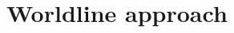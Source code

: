 \documentclass[a4paper,12pt]{article}
\begin{document}
\newpage





















\section{Worldline approach}
\end{document}

